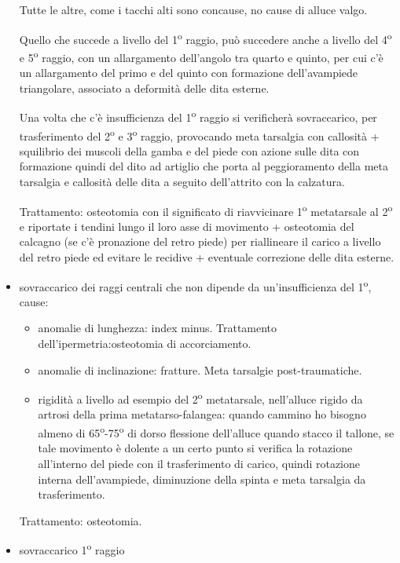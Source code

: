 \begin{itemize}
Tutte le altre, come i tacchi alti sono concause, no cause di alluce valgo.

Quello che succede a livello del 1\textsuperscript{o} raggio, può succedere anche a livello del 4\textsuperscript{o} e 5\textsuperscript{o} raggio, con un allargamento dell'angolo tra quarto e quinto,
per cui c'è un allargamento del primo e del quinto con formazione dell'avampiede triangolare, associato a deformità delle dita esterne.

Una volta che c'è insufficienza del 1\textsuperscript{o} raggio si verificherà sovraccarico, per trasferimento del 2\textsuperscript{o} e 3\textsuperscript{o} raggio, provocando meta tarsalgia con callosità + squilibrio dei muscoli della gamba e del piede con azione sulle dita con formazione quindi del dito ad artiglio che porta al peggioramento della meta tarsalgia e callosità delle dita a seguito dell'attrito con la calzatura.

Trattamento: osteotomia con il significato di riavvicinare 1\textsuperscript{o} metatarsale al 2\textsuperscript{o} e riportate i tendini lungo il loro asse di movimento + osteotomia del calcagno (se c'è pronazione del retro piede) per riallineare il carico a livello del retro piede ed evitare le recidive + eventuale correzione delle dita esterne.

\item sovraccarico dei raggi centrali
che non dipende da un'insufficienza del 1\textsuperscript{o}, cause:
\begin{itemize}
\item
  anomalie di lunghezza: index minus. Trattamento dell'ipermetria:osteotomia di accorciamento.
\item
  anomalie di inclinazione: fratture. Meta tarsalgie post-traumatiche.
\item
  rigidità a livello ad esempio del 2\textsuperscript{o} metatarsale, nell'alluce rigido da artrosi della prima metatarso-falangea: quando cammino ho bisogno almeno di 65\textsuperscript{o}-75\textsuperscript{o} di dorso flessione dell'alluce quando stacco il tallone, se tale movimento è dolente a un certo punto si verifica la rotazione all'interno del piede con il trasferimento di carico, quindi rotazione interna dell'avampiede, diminuzione della spinta e meta tarsalgia da trasferimento.
\end{itemize}
Trattamento: osteotomia.

\item sovraccarico 1\textsuperscript{o} raggio


\end{itemize}
